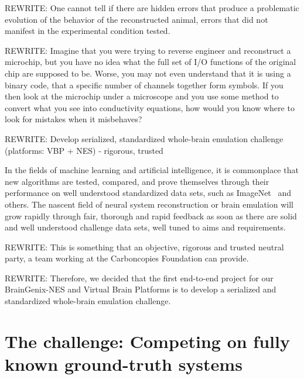 \documentclass{ldr-article}
\begin{document}
\alert{REWRITE:} One cannot tell if there are hidden errors that produce a problematic evolution of the behavior of the reconstructed animal, errors that did not manifest in the experimental condition tested.

\alert{REWRITE:} Imagine that you were trying to reverse engineer and reconstruct a microchip, but you have no idea what the full set of I/O functions of the original chip are supposed to be. Worse, you may not even understand that it is using a binary code, that a specific number of channels together form symbols. If you then look at the microchip under a microscope and you use some method to convert what you see into conductivity equations, how would you know where to look for mistakes when it misbehaves?

\alert{REWRITE:} Develop serialized, standardized whole-brain emulation challenge (platforms: VBP + NES) - rigorous, trusted

In the fields of machine learning and artificial intelligence, it is commonplace that new algorithms are tested, compared, and prove themselves through their performance on well understood standardized data sets, such as ImageNet~\cite{deng2009,russakovsky2015} and others. The nascent field of neural system reconstruction or brain emulation will grow rapidly through fair, thorough and rapid feedback as soon as there are solid and well understood challenge data sets, well tuned to aims and requirements.

\alert{REWRITE:} This is something that an objective, rigorous and trusted neutral party, a team working at the Carboncopies Foundation can provide.

\alert{REWRITE:} Therefore, we decided that the first end-to-end project for our BrainGenix-NES and Virtual Brain Platforms is to develop a serialized and standardized whole-brain emulation challenge.



\section{The challenge: Competing on fully known ground-truth systems}
\end{document}
